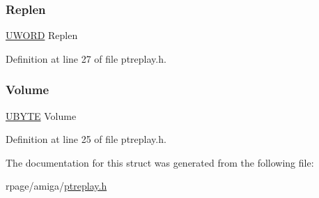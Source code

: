 \mbox{\label{struct_p_t_sample_a394fbd880f8bd006214517333330cd48}} 
\subsubsection{\texorpdfstring{Replen}{Replen}}
{\footnotesize\ttfamily \mbox{\hyperlink{utils_8h_aefbb6ca39ebcf009709e607d159766d5}{U\+W\+O\+RD}} Replen}



Definition at line 27 of file ptreplay.\+h.

\mbox{\label{struct_p_t_sample_adc4b7a0c5b86145401ff9bf56d52bf7a}} 
\subsubsection{\texorpdfstring{Volume}{Volume}}
{\footnotesize\ttfamily \mbox{\hyperlink{utils_8h_a122c4acf389c050379f00341fdcd5812}{U\+B\+Y\+TE}} Volume}



Definition at line 25 of file ptreplay.\+h.



The documentation for this struct was generated from the following file\+:\begin{DoxyCompactItemize}
\item 
rpage/amiga/\mbox{\hyperlink{ptreplay_8h}{ptreplay.\+h}}\end{DoxyCompactItemize}
